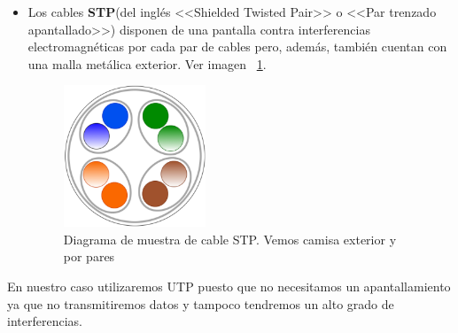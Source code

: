 \begin{itemize}
\item Los cables \textbf{STP}(del inglés <<Shielded Twisted Pair>> o <<Par trenzado apantallado>>) disponen de una pantalla contra interferencias electromagnéticas por cada par de cables pero, además, también cuentan con una malla metálica exterior. Ver imagen ~\ref{Img:Muestra STP}.
\begin{figure}
    \centering
    \includegraphics[width=0.4\textwidth]{img/STP.pdf}
    \caption[Diagrama de muestra de cable STP]{Diagrama de muestra de cable STP. Vemos camisa exterior y por pares} \label{Img:Muestra STP}
\end{figure}

\end{itemize}
En nuestro caso utilizaremos UTP puesto que no necesitamos un apantallamiento ya que no transmitiremos datos y tampoco tendremos un alto grado de interferencias.
